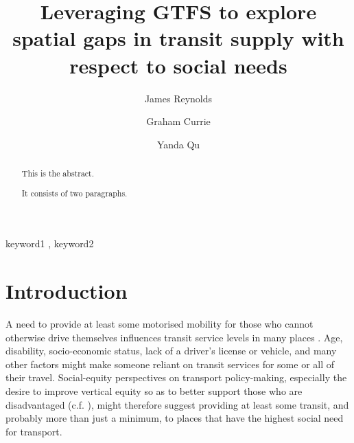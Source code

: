 \documentclass[preprint, 3p,
authoryear]{elsarticle} %
\begin{document}
\begin{frontmatter}

  \title{Leveraging GTFS to explore spatial gaps in transit supply with
respect to social needs}
    \author[Public Transport Research Group (PTRG)]{James Reynolds%
  }
    \author[Public Transport Research Group (PTRG)]{Graham Currie%
  }
    \author[Public Transport Research Group (PTRG)]{Yanda Qu%
  }
  
  \begin{abstract}
  This is the abstract.

  It consists of two paragraphs.
  \end{abstract}
    \begin{keyword}
    keyword1 \sep 
    keyword2
  \end{keyword}
  
 \end{frontmatter}

\hypertarget{introduction}{%
\section{Introduction}\label{introduction}}

A need to provide at least some motorised mobility for those who cannot
otherwise drive themselves influences transit service levels in many
places \citep{Currie:2016aa}. Age, disability, socio-economic status,
lack of a driver's license or vehicle, and many other factors might make
someone reliant on transit services for some or all of their travel.
Social-equity perspectives on transport policy-making, especially the
desire to improve vertical equity so as to better support those who are
disadvantaged (c.f. \citet{Litman:2016aa}), might therefore suggest
providing at least some transit, and probably more than just a minimum,
to places that have the highest social need for transport.
\end{document}
